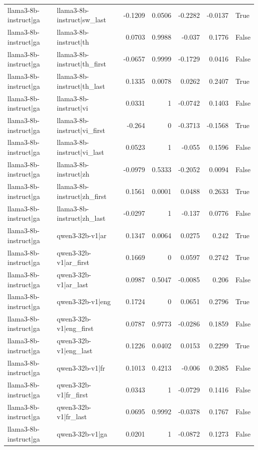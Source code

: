 \begin{table}
\begin{tabular}{l l r r r r l}
llama3-8b-instruct|ga & llama3-8b-instruct|sw_last & -0.1209 & 0.0506 & -0.2282 & -0.0137 & True \\
llama3-8b-instruct|ga & llama3-8b-instruct|th & 0.0703 & 0.9988 & -0.037 & 0.1776 & False \\
llama3-8b-instruct|ga & llama3-8b-instruct|th_first & -0.0657 & 0.9999 & -0.1729 & 0.0416 & False \\
llama3-8b-instruct|ga & llama3-8b-instruct|th_last & 0.1335 & 0.0078 & 0.0262 & 0.2407 & True \\
llama3-8b-instruct|ga & llama3-8b-instruct|vi & 0.0331 & 1 & -0.0742 & 0.1403 & False \\
llama3-8b-instruct|ga & llama3-8b-instruct|vi_first & -0.264 & 0 & -0.3713 & -0.1568 & True \\
llama3-8b-instruct|ga & llama3-8b-instruct|vi_last & 0.0523 & 1 & -0.055 & 0.1596 & False \\
llama3-8b-instruct|ga & llama3-8b-instruct|zh & -0.0979 & 0.5333 & -0.2052 & 0.0094 & False \\
llama3-8b-instruct|ga & llama3-8b-instruct|zh_first & 0.1561 & 0.0001 & 0.0488 & 0.2633 & True \\
llama3-8b-instruct|ga & llama3-8b-instruct|zh_last & -0.0297 & 1 & -0.137 & 0.0776 & False \\
llama3-8b-instruct|ga & qwen3-32b-v1|ar & 0.1347 & 0.0064 & 0.0275 & 0.242 & True \\
llama3-8b-instruct|ga & qwen3-32b-v1|ar_first & 0.1669 & 0 & 0.0597 & 0.2742 & True \\
llama3-8b-instruct|ga & qwen3-32b-v1|ar_last & 0.0987 & 0.5047 & -0.0085 & 0.206 & False \\
llama3-8b-instruct|ga & qwen3-32b-v1|eng & 0.1724 & 0 & 0.0651 & 0.2796 & True \\
llama3-8b-instruct|ga & qwen3-32b-v1|eng_first & 0.0787 & 0.9773 & -0.0286 & 0.1859 & False \\
llama3-8b-instruct|ga & qwen3-32b-v1|eng_last & 0.1226 & 0.0402 & 0.0153 & 0.2299 & True \\
llama3-8b-instruct|ga & qwen3-32b-v1|fr & 0.1013 & 0.4213 & -0.006 & 0.2085 & False \\
llama3-8b-instruct|ga & qwen3-32b-v1|fr_first & 0.0343 & 1 & -0.0729 & 0.1416 & False \\
llama3-8b-instruct|ga & qwen3-32b-v1|fr_last & 0.0695 & 0.9992 & -0.0378 & 0.1767 & False \\
llama3-8b-instruct|ga & qwen3-32b-v1|ga & 0.0201 & 1 & -0.0872 & 0.1273 & False \\

\end{tabular}
\end{table}
